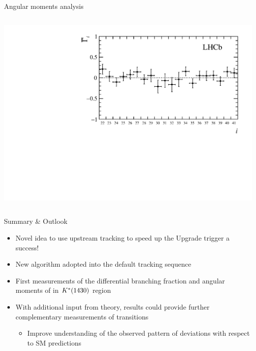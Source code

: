 \documentclass[aspectratio=1610]{beamer}
\def\Kstarfourteenthirty  {{\ensuremath{\kaon^{*}(1430)}}\xspace}
\begin{document}
\begin{frame}{Angular moments analysis}
\begin{columns}
\begin{column}{0.45\textwidth}
\includegraphics[height=0.44\textheight]{figs/kpimm/angular-analysis/mom_results_22_41.pdf}
\end{column}
\end{columns}
\end{frame}

\begin{frame}{Summary \& Outlook}

\begin{overlayarea}{\textwidth}{0.9\textheight}

\bigskip

\begin{itemize}
  \item[\ding{72}] Novel idea to use upstream tracking to speed up the Upgrade trigger a success!
  \item[\ding{72}] New algorithm adopted into the default tracking sequence
\end{itemize}
  \begin{itemize}
  \item[\ding{80}] First measurements of the differential branching fraction and angular moments of \BdToKpimm in \Kstarfourteenthirty region
  \item[\ding{80}] With additional input from theory, results could provide further complementary measurements of \btosmm transitions
  \begin{itemize}
    \item[\ding{70}] Improve understanding of the observed pattern of deviations with respect to SM predictions
  \end{itemize}
\end{itemize}

\bigskip

\end{overlayarea}
\end{frame}
\end{document}
